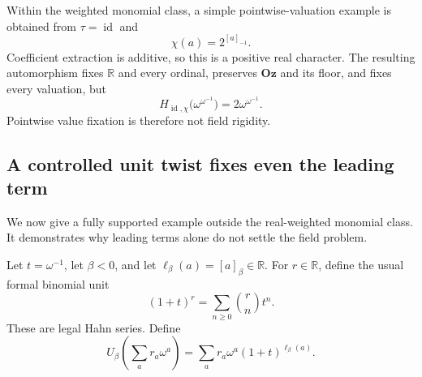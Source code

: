 \documentclass[11pt,a4paper]{article}
\numberwithin{equation}{section}
\theoremstyle{plain}
\theoremstyle{definition}
\theoremstyle{remark}
\newcommand{\Oz}{\mathbf{Oz}}
\newcommand{\R}{\mathbb{R}}
\newcommand{\id}{\operatorname{id}}
\begin{document}
Within the weighted monomial class, a simple pointwise-valuation example
is obtained from $\tau=\id$ and
\[
 \chi(a)=2^{[a]_{-1}}.
\]
Coefficient extraction is additive, so this is a positive real character.
The resulting automorphism fixes $\R$ and every ordinal, preserves $\Oz$
and its floor, and fixes every valuation, but
\[
 H_{\id,\chi}\bigl(\omega^{\omega^{-1}}\bigr)
    =2\omega^{\omega^{-1}}.
\]
Pointwise value fixation is therefore not field rigidity.

\subsection{A controlled unit twist fixes even the leading term}
We now give a fully supported example outside the real-weighted monomial
class. It demonstrates why leading terms alone do not settle the field
problem.

Let $t=\omega^{-1}$, let $\beta<0$, and let
$\ell_\beta(a)=[a]_\beta\in\R$. For $r\in\R$, define the usual formal
binomial unit
\[
 (1+t)^r=\sum_{n\ge0}\binom rn t^n.
\]
These are legal Hahn series. Define
\begin{equation}\label{sse:eq:unitlift}
 U_\beta\left(\sum_a r_a\omega^a\right)
 =\sum_a r_a\omega^a(1+t)^{\ell_\beta(a)}.
\end{equation}
\end{document}
